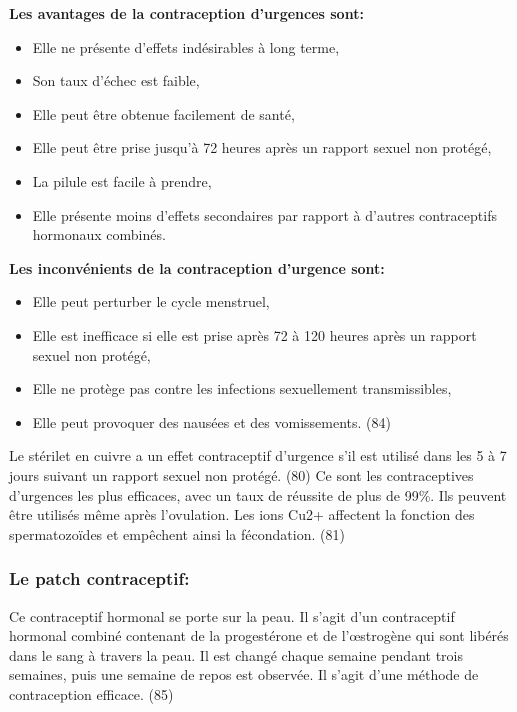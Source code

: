 \noindent\textbf{Les avantages de la contraception d’urgences sont: }

\begin{itemize}
  \item Elle ne présente d’effets indésirables à long terme,
  \item Son taux d’échec est faible, 
  \item Elle peut être obtenue facilement de santé, 
  \item	Elle peut être prise jusqu’à 72 heures après un rapport sexuel non protégé,
  \item	La pilule est facile à prendre, 
  \item Elle présente moins d’effets secondaires par rapport à d’autres contraceptifs hormonaux combinés. 
\end{itemize}

\vspace*{1em}

\noindent\textbf{Les inconvénients de la contraception d’urgence sont: }

\begin{itemize}
  \item	Elle peut perturber le cycle menstruel, 
  \item Elle est inefficace si elle est prise après 72 à 120 heures après un rapport sexuel non protégé, 
  \item Elle ne protège pas contre les infections sexuellement transmissibles,
  \item Elle peut provoquer des nausées et des vomissements. (84)
\end{itemize}

Le stérilet en cuivre a un effet contraceptif d’urgence s’il est utilisé dans les 5 à 7 jours suivant un rapport sexuel non protégé. (80) Ce sont les contraceptives d’urgences les plus efficaces, avec un taux de réussite de plus de 99\%. Ils peuvent être utilisés même après l’ovulation. Les ions Cu2+ affectent la fonction des spermatozoïdes et empêchent ainsi la fécondation. (81) 

\subsubsection{Le patch contraceptif: }

Ce contraceptif hormonal se porte sur la peau. Il s’agit d’un contraceptif hormonal combiné contenant de la progestérone et de l’œstrogène qui sont libérés dans le sang à travers la peau. Il est changé chaque semaine pendant trois semaines, puis une semaine de repos est observée. Il s’agit d’une méthode de contraception efficace. (85)   

